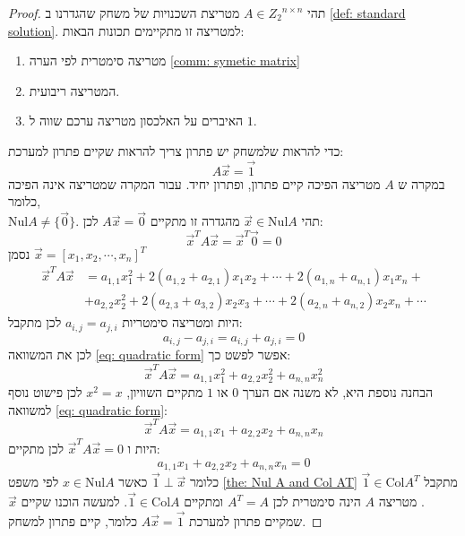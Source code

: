 \documentclass[12pt,leqno]{article}
\theoremstyle{theoremdd}
\newcommand{\Col}{\mathrm{Col}}
\newcommand{\Nul}{\mathrm{Nul}}
\begin{document}
\begin{proof}
    תהי 
    $A \in {Z_2}^{n \times n}$
    מטריצת השכנויות 
    של משחק
    שהגדרנו
    ב
    \ref{def: standard solution}.
    למטריצה זו מתקיימים תכונות הבאות:
    \begin{enumerate}
        \item 
        מטריצה סימטרית לפי הערה
        \ref{comm: symetic matrix}
        \item 
        המטריצה ריבועית.
        \item 
        האיברים על האלכסון
        מטריצה 
        ערכם שווה ל
        $1$.
    \end{enumerate}

    כדי להראות שלמשחק יש פתרון 
    צריך להראות שקיים פתרון למערכת:
    \[A \vec{x} = \vec{1} \]
    במקרה ש 
    $A$
    מטריצה הפיכה קיים פתרון, ופתרון יחיד.
    עבור המקרה שמטריצה אינה הפיכה 
    כלומר,
    \\
    $\Nul A \neq \{ \vec{0}\}$.
    תהי 
    $\vec{x} \in \Nul A$
    מהגדרה זו מתקיים
    $A\vec{x} = \vec{0}$
    לכן:
    \[\vec{x}^T A \vec{x} = \vec{x}^T\vec{0} = 0\]
    נסמן 
    $\vec{x} = [x_1, x_2, \cdots, x_n]^T$
    \begin{align}
        \label{eq: quadratic form}
            \vec{x}^T A \vec{x} &= a_{1,1}x_1^2 + 2(a_{1,2} + a_{2,1})x_1x_2 + \cdots + 2(a_{1,n} + a_{n,1})x_1x_n +  \\
            \nonumber &+ a_{2,2}x_2^2 +  2(a_{2,3} + a_{3,2})x_2x_3 + \cdots  + 2(a_{2,n} + a_{n,2})x_2x_n + \cdots 
    \end{align}
    היות ומטריצה סימטריות
    $a_{i,j} = a_{j,i}$
    לכן
    מתקבל:
    \[a_{i,j} - a_{j,i} = a_{i,j} + a_{j,i} = 0 \]
    לכן
    את המשוואה 
    \ref{eq: quadratic form}
    אפשר לפשט כך:
    \[ \vec{x}^T A \vec{x} = a_{1,1}x_1^2 + a_{2,2} x_2^2 +  a_{n,n} x_n^2\]
    הבחנה נוספת היא,
    לא משנה אם הערך 
    $0$
    או
    $1$
    מתקיים השוויון,
    $x^2 = x$
    לכן פישוט נוסף למשוואה 
    \ref{eq: quadratic form}:
    \[ \vec{x}^T A \vec{x} = a_{1,1}x_1 + a_{2,2} x_2 +  a_{n,n} x_n\]
    היות ו
    $ \vec{x}^T A \vec{x} = 0$
    לכן מתקיים:
    \[a_{1,1}x_1 + a_{2,2} x_2 +  a_{n,n} x_n = 0\]
    כלומר 
    $\vec{1} \perp  \vec{x}$
    כאשר 
    $x \in \Nul A$
    לפי משפט 
    \ref{the: Nul A and Col AT}
    מתקבל 
    $\vec{1} \in \Col A^T$.
    מטריצה
    $A$
    הינה
    סימטרית 
    לכן
    $A^T = A$
    ומתקיים
    $\vec{1} \in \Col A$.
    למעשה הוכנו 
    שקיים 
    $\vec x$
    שמקיים פתרון למערכת
    $A\vec{x} = \vec{1}$
    כלומר, קיים פתרון למשחק.
\end{proof}
\end{document}
